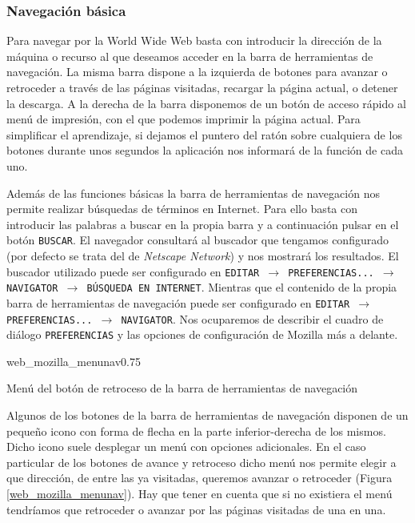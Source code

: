 \subsubsection{Navegación básica}

Para navegar por  la World Wide Web basta con  introducir la dirección
de  la máquina  o  recurso al  que  deseamos acceder  en  la barra  de
herramientas de navegación.  La misma barra dispone a  la izquierda de
botones para avanzar  o retroceder a través de  las páginas visitadas,
recargar la página  actual, o detener la descarga. A  la derecha de la
barra disponemos  de un botón de  acceso rápido al menú  de impresión,
con  el que  podemos imprimir  la página  actual. Para  simplificar el
aprendizaje, si dejamos  el puntero del ratón sobre  cualquiera de los
botones  durante  unos segundos  la  aplicación  nos informará  de  la
función de cada uno.

Además de las funciones básicas la barra de herramientas de navegación
nos  permite realizar  búsquedas de  términos en  Internet. Para  ello
basta  con  introducir  las  palabras  a buscar  en  la  propia  barra
y  a  continuación pulsar  en  el  botón  {\tt BUSCAR}.  El  navegador
consultará al buscador que tengamos  configurado (por defecto se trata
del  de {\em  Netscape Network})  y  nos mostrará  los resultados.  El
buscador utilizado puede ser  configurado en {\tt EDITAR $\rightarrow$
PREFERENCIAS...  $\rightarrow$  NAVIGATOR  $\rightarrow$  BÚSQUEDA  EN
INTERNET}.  Mientras   que  el  contenido   de  la  propia   barra  de
herramientas  de  navegación  puede  ser configurado  en  {\tt  EDITAR
$\rightarrow$ PREFERENCIAS... $\rightarrow$ NAVIGATOR}. Nos ocuparemos
de describir el cuadro de diálogo {\tt PREFERENCIAS} y las opciones de
configuración de {\sf Mozilla} más a delante.

\begin{figura}{web_mozilla_menunav}{0.75}
\caption{Menú del botón de retroceso de la barra de herramientas de
navegación}
\label{web_mozilla_menunav}
\end{figura}

Algunos  de los  botones de  la  barra de  herramientas de  navegación
disponen  de  un  pequeño  icono  con forma  de  flecha  en  la  parte
inferior-derecha de  los mismos. Dicho  icono suele desplegar  un menú
con  opciones adicionales.  En el  caso particular  de los  botones de
avance  y retroceso  dicho menú  nos permite  elegir a  que dirección,
de  entre las  ya  visitadas, queremos  avanzar  o retroceder  (Figura
\ref{web_mozilla_menunav}).  Hay  que  tener  en  cuenta  que  si  no
existiera el menú tendríamos que  retroceder o avanzar por las páginas
visitadas de una en una.

